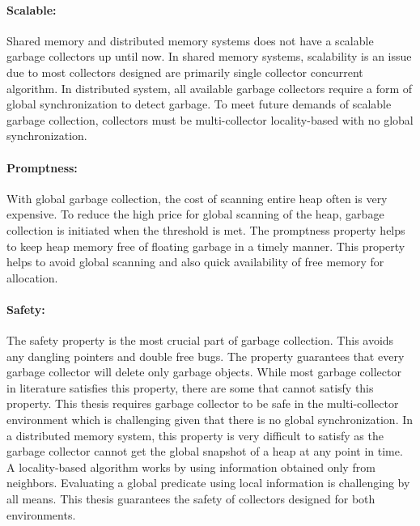 \paragraph{Scalable:}
Shared memory and distributed memory systems does not have a scalable garbage collectors up until now. In shared memory systems, scalability is an issue due to most collectors designed are primarily single collector concurrent algorithm. In distributed system, all available garbage collectors require a form of global synchronization to detect garbage. To meet future demands of scalable garbage collection, collectors must be multi-collector locality-based with no global synchronization.
\begin{comment}
In a shared memory system, the conventional single-threaded garbage collector does not scale well with an increase in the size of memory and number of processors. A locality-based concurrent multi-collector garbage collector is best possible solution for achieving scalability in shared memory systems.
With increase in the size of distributed global heap memory and  a number of nodes in distributed memory systems, conventional garbage collection techniques will not scale with global synchronization and scan the entire heap(s). A distributed garbage collection algorithm must be scalable to meet the future demands. Locality based garbage collection with no globally synchronized multi-collector mechanism is the best bet to scale. Related works in each of the collector chapters describe the scalability scenario in both environments. To my knowledge, there are no completely scalable garbage collectors in both environments.
\end{comment}
\paragraph{Promptness:}
With global garbage collection, the cost of scanning entire heap often is very expensive. To reduce the high price for global scanning of the heap, garbage collection is initiated when the threshold is met. The promptness property helps to keep heap memory free of floating garbage in a timely manner. This property helps to avoid global scanning and also quick availability of free memory for allocation.
\paragraph{Safety:}
The safety property is the most crucial part of garbage collection. This avoids any dangling pointers and double free bugs. The property guarantees that every garbage collector will delete only garbage objects. While most garbage collector in literature satisfies this property, there are some that cannot satisfy this property. This thesis requires garbage collector to be safe in the multi-collector environment which is challenging given that there is no global synchronization. In a distributed memory system, this property is very difficult to satisfy as the garbage collector cannot get the global snapshot of a heap at any point in time. A locality-based algorithm works by using information obtained only from neighbors. Evaluating a global predicate using local information is challenging by all means. This thesis guarantees the safety of collectors designed for both environments.
